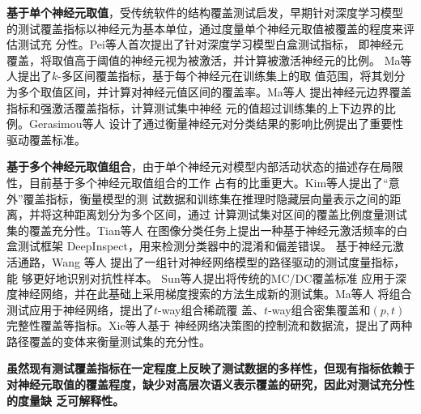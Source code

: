 

\textbf{基于单个神经元取值}，受传统软件的结构覆盖测试启发，早期针对深度学习模型
的测试覆盖指标以神经元为基本单位，通过度量单个神经元取值被覆盖的程度来评估测试充
分性。Pei等人首次提出了针对深度学习模型白盒测试指标，
即神经元覆盖，将取值高于阈值的神经元视为被激活，并计算被激活神经元的比例。 Ma等
人提出了$k$-多区间覆盖指标，基于每个神经元在训练集上的取
值范围，将其划分为多个取值区间，并计算对神经元值区间的覆盖率。Ma等人
提出神经元边界覆盖指标和强激活覆盖指标，计算测试集中神经
元的值超过训练集的上下边界的比例。Gerasimou等人
设计了通过衡量神经元对分类结果的影响比例提出了重要性驱动覆盖标准。

\textbf{基于多个神经元取值组合}，由于单个神经元对模型内部活动状态的描述存在局限
性，目前基于多个神经元取值组合的工作
占有的比重更大。Kim等人提出了“意外”覆盖指标，衡量模型的测
试数据和训练集在推理时隐藏层向量表示之间的距离，并将这种距离划分为多个区间，通过
计算测试集对区间的覆盖比例度量测试集的覆盖充分性。Tian等人
在图像分类任务上提出一种基于神经元激活频率的白盒测试框架
DeepInspect，用来检测分类器中的混淆和偏差错误。 {基于神经元激活通路}，Wang 等人
提出了一组针对神经网络模型的路径驱动的测试度量指标，能
够更好地识别对抗性样本。 Sun等人提出将传统的MC/DC覆盖标准
应用于深度神经网络，并在此基础上采用梯度搜索的方法生成新的测试集。Ma等人
将组合测试应用于神经网络，提出了$t$-way组合稀疏覆
盖、$t$-way组合密集覆盖和$(p,t)$完整性覆盖等指标。Xie等人基于
神经网络决策图的控制流和数据流，提出了两种路径覆盖的变体来衡量测试集的充分性。


\textbf{虽然现有测试覆盖指标在一定程度上反映了测试数据的多样性，但现有指标依赖于
对神经元取值的覆盖程度，缺少对高层次语义表示覆盖的研究，因此对测试充分性的度量缺
乏可解释性。}




